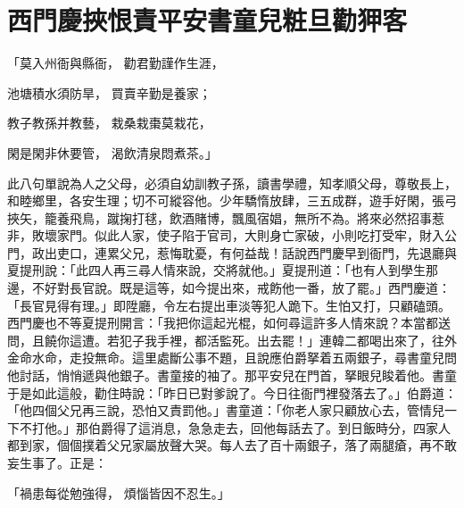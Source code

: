 %

\chapter{西門慶挾恨責平安\KG 書童兒粧旦勸狎客}


\begin{showcontents}{}




「莫入州衙與縣衙，  勸君勤謹作生涯，

池塘積水須防旱，  買賣辛勤是養家；

教子教孫并教藝，  栽桑栽棗莫栽花，

閑是閑非休要管，  渴飲清泉悶煮茶。」

此八句單說為人之父母，必須自幼訓教子孫，讀書學禮，知孝順父母，尊敬長上，和睦鄉里，各安生理；切不可縱容他。少年驕惰放肆，三五成群，遊手好閑，張弓挾矢，籠養飛鳥，蹴掬打毬，飲酒賭博，飄風宿娼，無所不為。將來必然招事惹非，敗壞家門。似此人家，使子陷于官司，大則身亡家破，小則吃打受牢，財入公門，政出吏口，連累父兄，惹悔耽憂，有何益哉！話說西門慶早到衙門，先退廳與夏提刑說：「此四人再三尋人情來說，交將就他。」夏提刑道：「也有人到學生那邊，不好對長官說。既是這等，如今提出來，戒飭他一番，放了罷。」西門慶道：「長官見得有理。」即陞廳，令左右提出車淡等犯人跪下。生怕又打，只顧磕頭。西門慶也不等夏提刑開言：「我把你這起光棍，如何尋這許多人情來說？本當都送問，且饒你這遭。若犯子我手裡，都活監死。出去罷！」連韓二都喝出來了，往外金命水命，走投無命。這里處斷公事不題，且說應伯爵拏着五兩銀子，尋書童兒問他討話，悄悄遞與他銀子。書童接的袖了。那平安兒在門首，拏眼兒睃着他。書童于是如此這般，勸住時說：「昨日已對爹說了。今日往衙門裡發落去了。」伯爵道：「他四個父兄再三說，恐怕又責罰他。」書童道：「你老人家只顧放心去，管情兒一下不打他。」那伯爵得了這消息，急急走去，回他每話去了。到日飯時分，四家人都到家，個個撲着父兄家屬放聲大哭。每人去了百十兩銀子，落了兩腿瘡，再不敢妄生事了。正是：

「禍患每從勉強得，  煩惱皆因不忍生。」


\end{showcontents}
